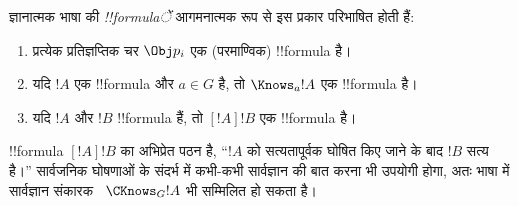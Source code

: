 \documentclass[../../../include/open-logic-section]{subfiles}
\begin{document}
\begin{defn}
  ज्ञानात्मक भाषा की \emph{!!{formula}ें} आगमनात्मक रूप से इस प्रकार
  परिभाषित होती हैं:
  \begin{enumerate}


  \item प्रत्येक प्रतिज्ञप्तिक चर $\Obj p_i$ एक (परमाण्विक) !!{formula} है।






  \item यदि $!A$ एक !!{formula} और $a \in G$ है, तो $\Knows_a !A$ एक
  !!{formula} है।
  
  \item यदि $!A$ और $!B$ !!{formula} हैं, तो $[!A] !B$ एक !!{formula} है।

\end{enumerate}
\end{defn}

!!{formula} $[!A] !B$ का अभिप्रेत पठन है, ``$!A$ को सत्यतापूर्वक घोषित किए
जाने के बाद $!B$ सत्य है।'' सार्वजनिक घोषणाओं के संदर्भ में कभी-कभी
सार्वज्ञान की बात करना भी उपयोगी होगा, अतः भाषा में सार्वज्ञान संकारक
~$\CKnows_G !A$ भी सम्मिलित हो सकता है।
\end{document}
